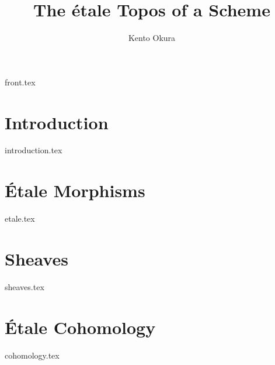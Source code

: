 \documentclass[11pt, openany]{memoir}
\title{The \'etale Topos of a Scheme}
\author{Kento Okura}
\begin{document}
  \frontmatter
  {front.tex}

  \mainmatter
  \chapter{Introduction}
  {introduction.tex}

  \chapter{\'Etale Morphisms}
  {etale.tex}

  \chapter{Sheaves}
  {sheaves.tex}

  \chapter{\'Etale Cohomology}
  {cohomology.tex}

  
  
\end{document}
